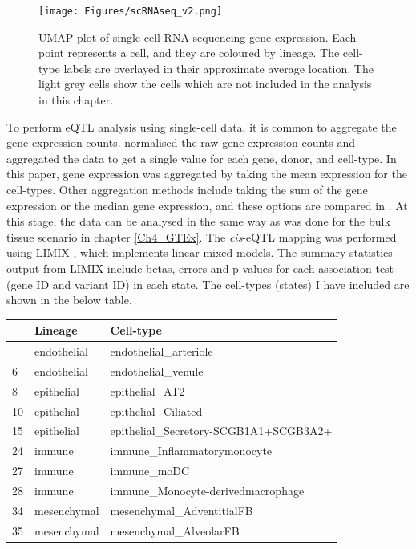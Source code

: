 \documentclass[
]{article}
\begin{document}
\begin{figure}[h]
\centering
\texttt{[image: Figures/scRNAseq\_v2.png]}
\caption{UMAP plot of single-cell RNA-sequencing gene expression. Each point represents a cell, and they are coloured by lineage. The cell-type labels are overlayed in their approximate average location. The light grey cells show the cells which are not included in the analysis in this chapter.}
\end{figure}

To perform eQTL analysis using single-cell data, it is common to
aggregate the gene expression counts. \textcite{Natri_2024_lung}
normalised the raw gene expression counts and aggregated the data to get
a single value for each gene, donor, and cell-type. In this paper, gene
expression was aggregated by taking the mean expression for the
cell-types. Other aggregation methods include taking the sum of the gene
expression or the median gene expression, and these options are compared
in \autocite{Cuomo_2021_Optimising}. At this stage, the data can be
analysed in the same way as was done for the bulk tissue scenario in
chapter \ref{Ch4_GTEx}. The \emph{cis}-eQTL mapping was performed using
LIMIX \autocite{Lippert_2014_LIMIX}, which implements linear mixed
models. The summary statistics output from LIMIX include betas, errors
and p-values for each association test (gene ID and variant ID) in each
state. The cell-types (states) I have included are shown in the below
table.

\footnotesize

\begin{longtable}[]{@{}lll@{}}
\toprule\noalign{}
& Lineage & Cell-type \\
\midrule\noalign{}
\endhead
\bottomrule\noalign{}
\endlastfoot
2 & endothelial & endothelial\_arteriole \\
6 & endothelial & endothelial\_venule \\
8 & epithelial & epithelial\_AT2 \\
10 & epithelial & epithelial\_Ciliated \\
15 & epithelial & epithelial\_Secretory-SCGB1A1+SCGB3A2+ \\
24 & immune & immune\_Inflammatorymonocyte \\
27 & immune & immune\_moDC \\
28 & immune & immune\_Monocyte-derivedmacrophage \\
34 & mesenchymal & mesenchymal\_AdventitialFB \\
35 & mesenchymal & mesenchymal\_AlveolarFB \\
\end{longtable}
\end{document}
